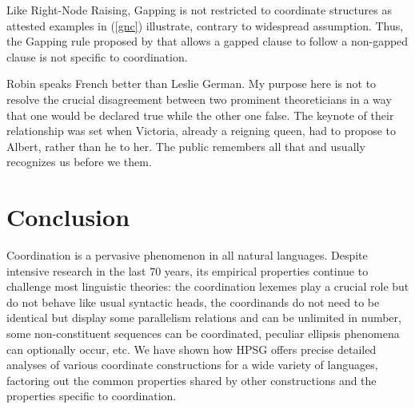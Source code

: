 \begin{figure}
\centering
{}
\end{figure}

\newpage
Like Right-Node Raising, Gapping is not restricted to coordinate structures as  attested 
examples in (\ref{gnc}) illustrate, contrary to widespread assumption.   Thus, the Gapping rule
proposed by \citet[]{sangheepark} that allows a gapped clause to follow a non-gapped clause is not
specific to coordination.

\eal
\label{gnc}
\ex Robin speaks French better than Leslie \trace{} German.
\ex My purpose here is not to resolve the crucial disagreement between two prominent theoreticians in a way that one would be declared true while the other one \trace{} false.
\ex The keynote of their relationship was set when Victoria, already a reigning queen,
had to propose to Albert, rather than he \trace{} to her.
\ex The public remembers all that and usually recognizes us before we \trace{} them.
\zl




\section{Conclusion}

Coordination is a pervasive phenomenon in all natural languages. Despite intensive research in the
last 70 years, its empirical properties continue to challenge most linguistic theories: the
coordination lexemes play a crucial role but do not behave like usual syntactic heads, the
coordinands do not need to be identical but display some parallelism relations and can be unlimited
in number, some non-constituent sequences can be coordinated, peculiar ellipsis phenomena can
optionally occur, etc. We have shown how HPSG offers precise detailed analyses of various coordinate
constructions for a wide variety of languages, factoring out the common properties shared by other
constructions and the properties specific to coordination.

